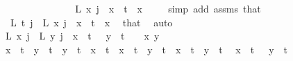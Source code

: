 \begin{isabellebody}
\ \ \ \ \ \ \ \ \ \ \isamarkupfalse%
\ \isamarkupfalse%
\ {\isachardoublequoteopen}{\isachardot}{\kern0pt}{\isachardot}{\kern0pt}{\isachardot}{\kern0pt}\ {\isacharequal}{\kern0pt}\ L{\isacharprime}{\kern0pt}\ x\ j{\isachardoublequoteclose}\ \ {\isachardoublequoteopen}x\ {\isacharless}{\kern0pt}\ t{\isachardoublequoteclose}\ \ x\ \isamarkupfalse%
\ {\isacharasterisk}{\kern0pt}\ \isamarkupfalse%
\ {\isacharparenleft}{\kern0pt}simp\ add{\isacharcolon}{\kern0pt}\ assms{\isacharparenleft}{\kern0pt}{}{\isacharparenright}{\kern0pt}\ that{\isacharparenright}{\kern0pt}\isanewline
\ \ \ \ \ \ \ \ \ \ \isamarkupfalse%
\ \isamarkupfalse%
\ {\isacharasterisk}{\kern0pt}{\isacharasterisk}{\kern0pt}{\isacharcolon}{\kern0pt}\ {\isachardoublequoteopen}L{\isacharprime}{\kern0pt}\ t\ j\ {\isacharequal}{\kern0pt}\ L{\isacharprime}{\kern0pt}\ x\ j{\isachardoublequoteclose}\ \ {\isachardoublequoteopen}x\ {\isacharless}{\kern0pt}\ t{\isachardoublequoteclose}\ \ x\ \isamarkupfalse%
\ that\ \isamarkupfalse%
\ auto\isanewline
\ \ \ \ \ \ \ \ \ \ \isamarkupfalse%
\ {\isachardoublequoteopen}L{\isacharprime}{\kern0pt}\ x\ j\ {\isacharequal}{\kern0pt}\ L{\isacharprime}{\kern0pt}\ y\ j{\isachardoublequoteclose}\ \ {\isachardoublequoteopen}x\ {\isacharless}{\kern0pt}\ t\ {\isacharplus}{\kern0pt}\ {}{\isachardoublequoteclose}\ {\isachardoublequoteopen}y\ {\isacharless}{\kern0pt}\ t\ {\isacharplus}{\kern0pt}\ {}{\isachardoublequoteclose}\ \ x\ y\ \isanewline
\ \ \ \ \ \ \ \ \ \ \isamarkupfalse%
{\isacharminus}{\kern0pt}\isanewline
\ \ \ \ \ \ \ \ \ \ \ \ \isamarkupfalse%
\ {\isachardoublequoteopen}x\ {\isacharless}{\kern0pt}\ t\ {\isasymand}\ y\ {\isacharequal}{\kern0pt}\ t{\isachardoublequoteclose}\ {\isacharbar}{\kern0pt}\ {\isachardoublequoteopen}y\ {\isacharless}{\kern0pt}\ t\ {\isasymand}\ x\ {\isacharequal}{\kern0pt}\ t{\isachardoublequoteclose}\ {\isacharbar}{\kern0pt}\ {\isachardoublequoteopen}x\ {\isacharequal}{\kern0pt}\ t\ {\isasymand}\ y\ {\isacharequal}{\kern0pt}\ t{\isachardoublequoteclose}\ {\isacharbar}{\kern0pt}\ {\isachardoublequoteopen}x\ {\isacharless}{\kern0pt}\ t\ {\isasymand}\ y\ {\isacharless}{\kern0pt}\ t{\isachardoublequoteclose}\ \isamarkupfalse%
\ {\isacartoucheopen}x\ {\isacharless}{\kern0pt}\ t\ {\isacharplus}{\kern0pt}\ {}{\isacartoucheclose}\ {\isacartoucheopen}y\ {\isacharless}{\kern0pt}\ t\ {\isacharplus}{\kern0pt}\ {}{\isacartoucheclose}\ \isamarkupfalse%

\end{isabellebody}
